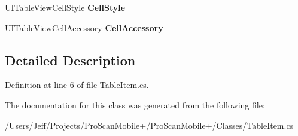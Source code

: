 \begin{DoxyCompactItemize}
\item 
\hypertarget{class_pro_scan_mobile_1_1_table_item_acf26e800b5b122873d04a26052240028}{U\-I\-Table\-View\-Cell\-Style {\bfseries Cell\-Style}}\label{class_pro_scan_mobile_1_1_table_item_acf26e800b5b122873d04a26052240028}

\item 
\hypertarget{class_pro_scan_mobile_1_1_table_item_a8b04487099471c9f9cfc7c5a52a40b10}{U\-I\-Table\-View\-Cell\-Accessory {\bfseries Cell\-Accessory}}\label{class_pro_scan_mobile_1_1_table_item_a8b04487099471c9f9cfc7c5a52a40b10}

\end{DoxyCompactItemize}


\subsection{Detailed Description}


Definition at line 6 of file Table\-Item.\-cs.



The documentation for this class was generated from the following file\-:\begin{DoxyCompactItemize}
\item 
/\-Users/\-Jeff/\-Projects/\-Pro\-Scan\-Mobile+/\-Pro\-Scan\-Mobile+/\-Classes/Table\-Item.\-cs\end{DoxyCompactItemize}
